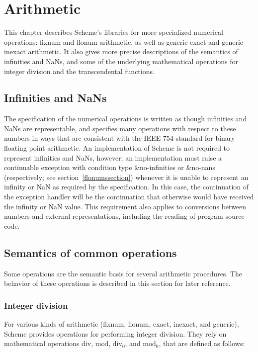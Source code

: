 \chapter{Arithmetic}
\label{numberchapter}

This chapter describes Scheme's libraries for more specialized
numerical operations: fixnum and flonum arithmetic, as well as generic
exact and generic inexact arithmetic.  It also gives more precise
descriptions of the semantics of infinities and NaNs, and some of the
underlying mathematical operations for integer division and the
transcendental functions.

\section{Infinities and NaNs}
\label{infinitiesnanssection}

The specification of the numerical operations is written as though
infinities and NaNs are representable, and specifies many operations
with respect to these numbers in ways that are consistent with the
IEEE 754 standard for binary floating point arithmetic.  
An implementation of Scheme is not required to represent infinities and
NaNs, however;
an implementation must raise a continuable exception with
condition type {\cf\&no-infinities} or {\cf\&no-nans} (respectively;
see section~\ref{flonumssection})
whenever it is unable to represent an infinity or NaN as required by
the specification.  In this case, the continuation of the exception
handler will be the continuation that otherwise would have received
the infinity or NaN value.  This requirement also applies to
conversions between numbers and external representations, including
the reading of program source code.

\section{Semantics of common operations}

Some operations are the semantic basis for several arithmetic
procedures.  The behavior of these operations is described in this
section for later reference.

\subsection{Integer division}
\label{integerdivision}

For various kinds of arithmetic (fixnum, flonum, exact, inexact, and
generic), Scheme provides operations for performing integer
division.  They rely on mathematical operations $\mathrm{div}$,
$\mathrm{mod}$, $\mathrm{div}_0$, and
$\mathrm{mod}_0$, that are defined as follows:

